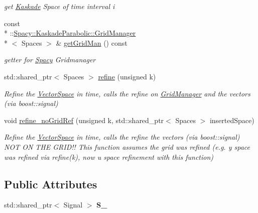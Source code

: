 \begin{DoxyCompactItemize}
\begin{DoxyCompactList}\small\item\em get \hyperlink{namespaceSpacy_1_1Kaskade}{Kaskade} Space of time interval i \end{DoxyCompactList}\item 
const \\*
\-::\hyperlink{classSpacy_1_1KaskadeParabolic_1_1GridManager}{Spacy\-::\-Kaskade\-Parabolic\-::\-Grid\-Manager}\\*
$<$ Spaces $>$ \& \hyperlink{classSpacy_1_1KaskadeParabolic_1_1VectorCreator_ad9c520beb552f8dd854aa4fe682c9d20}{get\-Grid\-Man} () const 
\begin{DoxyCompactList}\small\item\em getter for \hyperlink{namespaceSpacy}{Spacy} Gridmanager \end{DoxyCompactList}\item 
std\-::shared\-\_\-ptr$<$ Spaces $>$ \hyperlink{classSpacy_1_1KaskadeParabolic_1_1VectorCreator_a94b57a790f05cf8f22467e618fe041d7}{refine} (unsigned k)
\begin{DoxyCompactList}\small\item\em Refine the \hyperlink{classSpacy_1_1VectorSpace}{Vector\-Space} in time, calls the refine on \hyperlink{classSpacy_1_1KaskadeParabolic_1_1GridManager}{Grid\-Manager} and the vectors (via boost\-::signal) \end{DoxyCompactList}\item 
void \hyperlink{classSpacy_1_1KaskadeParabolic_1_1VectorCreator_a47720fd71a78ea1efd84678423670e88}{refine\-\_\-no\-Grid\-Ref} (unsigned k, std\-::shared\-\_\-ptr$<$ Spaces $>$ inserted\-Space)
\begin{DoxyCompactList}\small\item\em Refine the \hyperlink{classSpacy_1_1VectorSpace}{Vector\-Space} in time, calls the refine the vectors (via boost\-::signal) N\-O\-T O\-N T\-H\-E G\-R\-I\-D!! This function assumes the grid was refined (e.\-g. y space was refined via refine(k), now u space refinement with this function) \end{DoxyCompactList}\end{DoxyCompactItemize}
\subsection*{Public Attributes}
\begin{DoxyCompactItemize}
\item 
\hypertarget{classSpacy_1_1KaskadeParabolic_1_1VectorCreator_ae1217b6dfd7a9cd5cc4a43f7aa9f49be}{std\-::shared\-\_\-ptr$<$ Signal $>$ {\bfseries S\-\_\-}}\label{classSpacy_1_1KaskadeParabolic_1_1VectorCreator_ae1217b6dfd7a9cd5cc4a43f7aa9f49be}

\end{DoxyCompactItemize}


